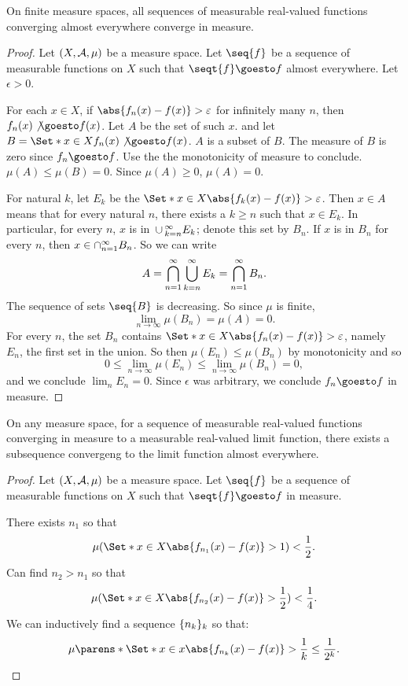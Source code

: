 \begin{prop}
On finite measure spaces,
all sequences of measurable
real-valued functions
converging almost
everywhere converge in
measure.

\begin{proof}

Let $(X, \mathcal{A}, \mu)$
be a measure space.
Let $\seq{f}$ be a sequence
of measurable functions on $X$
such that $\seqt{f} \goesto f$
almost everywhere.
Let $\epsilon > 0$.

For each $x \in X$, if
$\abs{f_n(x) - f(x)} > \epsilon$
for infinitely many $n$,
then $f_n(x) \not\goesto f(x)$.
Let $A$ be the set of such $x$.
and let $B =
\Set*{
x \in X
}{
f_n(x) \not\goesto f(x)
}$.
$A$ is a subset
of $B$.
The measure of $B$
is zero
since $f_n \goesto f$.
Use the the monotonicity
of measure to conclude.
$\mu(A) \leq \mu(B) = 0$.
Since $\mu(A) \geq 0$,
$\mu(A) = 0$.

For natural
$k$, let $E_k$
be the
$\Set*{x \in X}
{\abs{f_k(x) - f(x)} > \epsilon}$.
Then $x \in A$ means that
for every natural $n$, there exists
a $k \geq n$ such that $x \in E_k$.
In particular, for every $n$,
$x$ is in $\,\cup\,_{k = n}^{\infty}E_k$;
denote this set by $B_n$.
If $x$ is in $B_n$ for every
$n$, then
$x \in \cap_{n = 1}^{\infty} B_n$.
So we can write
\[
  A = \bigcap_{n = 1}^{\infty}
  \bigcup_{k = n}^{\infty}
  E_k
  = \bigcap_{n = 1}^{\infty}
  B_n
  .
\]
The sequence of sets $\seq{B}$
is decreasing. So since $\mu$ is finite,
\[
  \lim_{n \to \infty} \mu(B_n) = \mu(A) = 0.
\]
For every $n$, the set $B_n$ contains
$\Set*{x \in X}{\abs{f_n(x) - f(x)} >
\epsilon}$,
namely $E_n$, the first
set in the union.
So then $\mu(E_n) \leq \mu(B_n)$
by monotonicity and so
\[
  0
  \leq \lim_{n \to \infty} \mu(E_n)
  \leq \lim_{n \to \infty} \mu(B_n)
  = 0,
\]
and we conclude $\lim_{n} E_n = 0$.
Since $\epsilon$ was arbitrary,
we conclude $f_n \goesto f$ in
measure.

\end{proof}

\end{prop}

\begin{prop}
  On any measure space,
  for a sequence
  of measurable real-valued
  functions converging
  in measure to a measurable
  real-valued limit function,
  there exists a subsequence
  convergeng to the limit
  function almost everywhere.

  \begin{proof}
Let $(X, \mathcal{A}, \mu)$
be a measure space.
Let $\seq{f}$ be a sequence
of measurable functions on $X$
such that $\seqt{f} \goesto f$
in measure.

There exists $n_1$
so that
    \[
      \mu(\Set*{x \in X}{\abs{f_{n_1}(x) - f(x)} > 1}) < \frac{1}{2}.
    \]
    Can find $n_2 > n_1$ so that
    \[
      \mu(\Set*{x \in X}{\abs{f_{n_2}(x) - f(x)} > \frac{1}{2}}) < \frac{1}{4}.
    \]
    We can inductively find
    a sequence
    $\{n_k\}_k$
    so that:
    \[
      \mu\parens*{\Set*{
        x \in x
      }{
        \abs{f_{n_k}(x) - f(x)} > \frac{1}{k}
      }} \leq \frac{1}{2^k}.
    \]
  \end{proof}
\end{prop}
\strats
